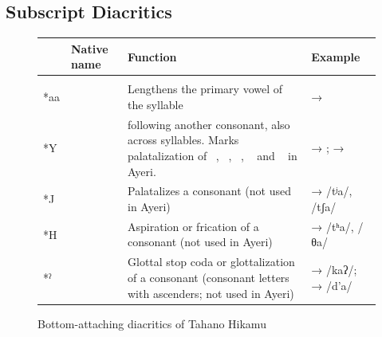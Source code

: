 \subsection{Subscript Diacritics}

\begin{figure}
\caption{Bottom-attaching diacritics of Tahano Hikamu}
\begin{tabu} to 
\toprule
\tableheaderfont

	& Native name
	& Function
	& Example
	\\
	
\toprule

\tablesubheaderfont{}\\

\midrule

*aa
	& 
	& Lengthens the primary vowel of the syllable
	&  → 
	\\

\midrule
	
*Y
	& 
	&  following another consonant, also across syllables. Marks 
		palatalization of ~, ~, 
		~, ~ and ~ in 
		Ayeri.
	&  → ;  → 
	\\
	
\midrule
	
*J
	& 
	& Palatalizes a consonant (not used in Ayeri)
	&  →  /tʲa/, /tʃa/
	\\
	
\midrule
	
*H
	& 
	& Aspiration or frication of a consonant (not used in Ayeri)
	&  →  /tʰa/, {/θa/}
	\\
	
\midrule
	
*\hspace{-.25em}ˀ
	& 
	& Glottal stop coda or glottalization of a consonant (consonant letters 
		with ascenders; not used in Ayeri)
	&  →  /kaʔ/;  →  /d’a/
	\\

\midrule


\end{tabu}
\end{figure}
